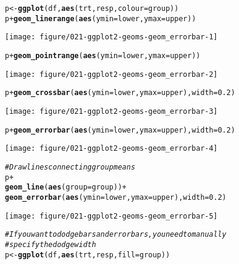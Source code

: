 \documentclass[a4paper,titlepage]{tufte-handout}\usepackage[]{graphicx}\usepackage[]{color}
\makeatletter
\def\maxwidth{ %
  \ifdim\Gin@nat@width>\linewidth
    \linewidth
  \else
    \Gin@nat@width
  \fi
}
\newcommand{\hlnum}[1]{\textcolor[rgb]{0.686,0.059,0.569}{#1}}%
\newcommand{\hlcom}[1]{\textcolor[rgb]{0.678,0.584,0.686}{\textit{#1}}}%
\newcommand{\hlopt}[1]{\textcolor[rgb]{0,0,0}{#1}}%
\newcommand{\hlstd}[1]{\textcolor[rgb]{0.345,0.345,0.345}{#1}}%
\newcommand{\hlkwb}[1]{\textcolor[rgb]{0.69,0.353,0.396}{#1}}%
\newcommand{\hlkwc}[1]{\textcolor[rgb]{0.333,0.667,0.333}{#1}}%
\newcommand{\hlkwd}[1]{\textcolor[rgb]{0.737,0.353,0.396}{\textbf{#1}}}%
\newenvironment{kframe}{%
 \def\at@end@of@kframe{}%
 \ifinner\ifhmode%
  \def\at@end@of@kframe{\end{minipage}}%
  \begin{minipage}{\columnwidth}%
 \fi\fi%
 \def\FrameCommand##1{\hskip\@totalleftmargin \hskip-\fboxsep
 \colorbox{shadecolor}{##1}\hskip-\fboxsep
     \hskip-\linewidth \hskip-\@totalleftmargin \hskip\columnwidth}%
 \MakeFramed {\advance\hsize-\width
   \@totalleftmargin\z@ \linewidth\hsize
   \@setminipage}}%
 {\par\unskip\endMakeFramed%
 \at@end@of@kframe}
\newenvironment{knitrout}{}{} %
\makeatother
\begin{document}
\begin{knitrout}
\begin{kframe}
\begin{alltt}
\hlstd{p} \hlkwb{<-} \hlkwd{ggplot}\hlstd{(df,} \hlkwd{aes}\hlstd{(trt, resp,} \hlkwc{colour} \hlstd{= group))}
\hlstd{p} \hlopt{+} \hlkwd{geom_linerange}\hlstd{(}\hlkwd{aes}\hlstd{(}\hlkwc{ymin} \hlstd{= lower,} \hlkwc{ymax} \hlstd{= upper))}
\end{alltt}
\end{kframe}
\texttt{[image: figure/021-ggplot2-geoms-geom\_errorbar-1]} 
\begin{kframe}\begin{alltt}
\hlstd{p} \hlopt{+} \hlkwd{geom_pointrange}\hlstd{(}\hlkwd{aes}\hlstd{(}\hlkwc{ymin} \hlstd{= lower,} \hlkwc{ymax} \hlstd{= upper))}
\end{alltt}
\end{kframe}
\texttt{[image: figure/021-ggplot2-geoms-geom\_errorbar-2]} 
\begin{kframe}\begin{alltt}
\hlstd{p} \hlopt{+} \hlkwd{geom_crossbar}\hlstd{(}\hlkwd{aes}\hlstd{(}\hlkwc{ymin} \hlstd{= lower,} \hlkwc{ymax} \hlstd{= upper),} \hlkwc{width} \hlstd{=} \hlnum{0.2}\hlstd{)}
\end{alltt}
\end{kframe}
\texttt{[image: figure/021-ggplot2-geoms-geom\_errorbar-3]} 
\begin{kframe}\begin{alltt}
\hlstd{p} \hlopt{+} \hlkwd{geom_errorbar}\hlstd{(}\hlkwd{aes}\hlstd{(}\hlkwc{ymin} \hlstd{= lower,} \hlkwc{ymax} \hlstd{= upper),} \hlkwc{width} \hlstd{=} \hlnum{0.2}\hlstd{)}
\end{alltt}
\end{kframe}
\texttt{[image: figure/021-ggplot2-geoms-geom\_errorbar-4]} 
\begin{kframe}\begin{alltt}
\hlcom{# Draw lines connecting group means}
\hlstd{p} \hlopt{+}
  \hlkwd{geom_line}\hlstd{(}\hlkwd{aes}\hlstd{(}\hlkwc{group} \hlstd{= group))} \hlopt{+}
  \hlkwd{geom_errorbar}\hlstd{(}\hlkwd{aes}\hlstd{(}\hlkwc{ymin} \hlstd{= lower,} \hlkwc{ymax} \hlstd{= upper),} \hlkwc{width} \hlstd{=} \hlnum{0.2}\hlstd{)}
\end{alltt}
\end{kframe}
\texttt{[image: figure/021-ggplot2-geoms-geom\_errorbar-5]} 
\begin{kframe}\begin{alltt}
\hlcom{# If you want to dodge bars and errorbars, you need to manually}
\hlcom{# specify the dodge width}
\hlstd{p} \hlkwb{<-} \hlkwd{ggplot}\hlstd{(df,} \hlkwd{aes}\hlstd{(trt, resp,} \hlkwc{fill} \hlstd{= group))}

\end{alltt}
\end{kframe}
\end{knitrout}
\end{document}
